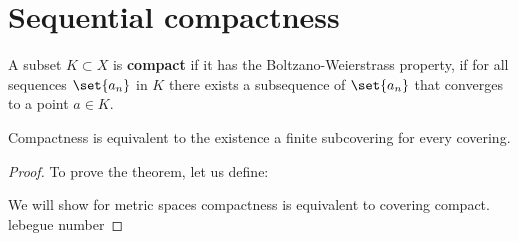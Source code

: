 \section{Sequential compactness}

A subset \(K \subset X\) is \textbf{compact} if it has the Boltzano-Weierstrass property, if for all sequences \(\set{a_n}\) in \(K\) there exists a subsequence of \(\set{a_n}\) that converges to a point \(a \in K\).

\begin{theorem}
    Compactness is equivalent to the existence a finite subcovering for every covering.
\end{theorem}
\begin{proof}
    To prove the theorem, let us define:

    We will show for metric spaces compactness is equivalent to covering compact.
    lebegue number
\end{proof}





